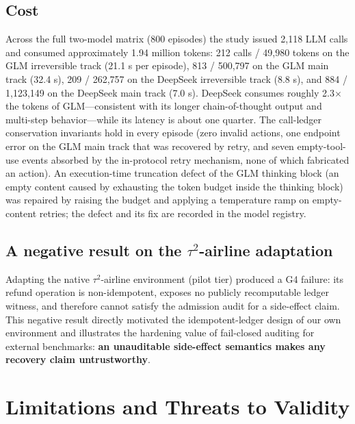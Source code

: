 \documentclass[10pt]{article}
\begin{document}
\subsection{Cost}

Across the full two-model matrix (800 episodes) the study issued 2,118 LLM calls and consumed approximately 1.94 million tokens: 212 calls / 49,980 tokens on the GLM irreversible track (21.1 s per episode), 813 / 500,797 on the GLM main track (32.4 s), 209 / 262,757 on the DeepSeek irreversible track (8.8 s), and 884 / 1,123,149 on the DeepSeek main track (7.0 s). DeepSeek consumes roughly 2.3$\times$ the tokens of GLM---consistent with its longer chain-of-thought output and multi-step behavior---while its latency is about one quarter. The call-ledger conservation invariants hold in every episode (zero invalid actions, one endpoint error on the GLM main track that was recovered by retry, and seven empty-tool-use events absorbed by the in-protocol retry mechanism, none of which fabricated an action). An execution-time truncation defect of the GLM thinking block (an empty content caused by exhausting the token budget inside the thinking block) was repaired by raising the budget and applying a temperature ramp on empty-content retries; the defect and its fix are recorded in the model registry.

\subsection{A negative result on the $\tau^{2}$-airline adaptation}

Adapting the native $\tau^{2}$-airline environment (pilot tier) produced a G4 failure: its refund operation is non-idempotent, exposes no publicly recomputable ledger witness, and therefore cannot satisfy the admission audit for a side-effect claim. This negative result directly motivated the idempotent-ledger design of our own environment and illustrates the hardening value of fail-closed auditing for external benchmarks: \textbf{an unauditable side-effect semantics makes any recovery claim untrustworthy}.

\section{Limitations and Threats to Validity}
\end{document}
